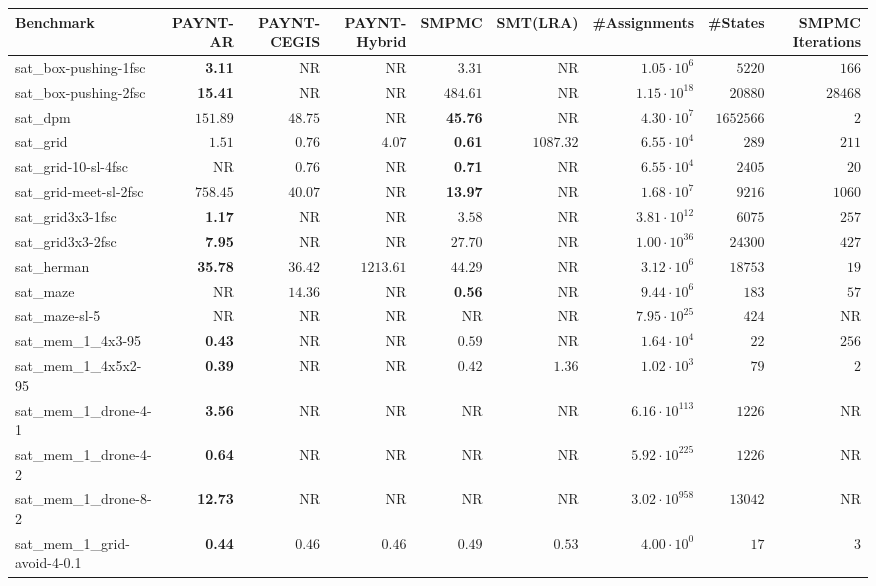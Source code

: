 \begin{tabular}{lrrrrrrrr}
\toprule
Benchmark & PAYNT-AR & PAYNT-CEGIS & PAYNT-Hybrid & SMPMC & SMT(LRA) & \#Assignments & \#States & SMPMC Iterations \\
\midrule
sat\_box-pushing-1fsc & \textbf{3.11} & NR & NR & $3.31$ & NR & $1.05\cdot 10^{6}$ & $5220$ & $166$ \\
sat\_box-pushing-2fsc & \textbf{15.41} & NR & NR & $484.61$ & NR & $1.15\cdot 10^{18}$ & $20880$ & $28468$ \\
sat\_dpm & $151.89$ & $48.75$ & NR & \textbf{45.76} & NR & $4.30\cdot 10^{7}$ & $1652566$ & $2$ \\
sat\_grid & $1.51$ & $0.76$ & $4.07$ & \textbf{0.61} & $1087.32$ & $6.55\cdot 10^{4}$ & $289$ & $211$ \\
sat\_grid-10-sl-4fsc & NR & $0.76$ & NR & \textbf{0.71} & NR & $6.55\cdot 10^{4}$ & $2405$ & $20$ \\
sat\_grid-meet-sl-2fsc & $758.45$ & $40.07$ & NR & \textbf{13.97} & NR & $1.68\cdot 10^{7}$ & $9216$ & $1060$ \\
sat\_grid3x3-1fsc & \textbf{1.17} & NR & NR & $3.58$ & NR & $3.81\cdot 10^{12}$ & $6075$ & $257$ \\
sat\_grid3x3-2fsc & \textbf{7.95} & NR & NR & $27.70$ & NR & $1.00\cdot 10^{36}$ & $24300$ & $427$ \\
sat\_herman & \textbf{35.78} & $36.42$ & $1213.61$ & $44.29$ & NR & $3.12\cdot 10^{6}$ & $18753$ & $19$ \\
sat\_maze & NR & $14.36$ & NR & \textbf{0.56} & NR & $9.44\cdot 10^{6}$ & $183$ & $57$ \\
sat\_maze-sl-5 & NR & NR & NR & NR & NR & $7.95\cdot 10^{25}$ & $424$ & NR \\
sat\_mem\_1\_4x3-95 & \textbf{0.43} & NR & NR & $0.59$ & NR & $1.64\cdot 10^{4}$ & $22$ & $256$ \\
sat\_mem\_1\_4x5x2-95 & \textbf{0.39} & NR & NR & $0.42$ & $1.36$ & $1.02\cdot 10^{3}$ & $79$ & $2$ \\
sat\_mem\_1\_drone-4-1 & \textbf{3.56} & NR & NR & NR & NR & $6.16\cdot 10^{113}$ & $1226$ & NR \\
sat\_mem\_1\_drone-4-2 & \textbf{0.64} & NR & NR & NR & NR & $5.92\cdot 10^{225}$ & $1226$ & NR \\
sat\_mem\_1\_drone-8-2 & \textbf{12.73} & NR & NR & NR & NR & $3.02\cdot 10^{958}$ & $13042$ & NR \\
sat\_mem\_1\_grid-avoid-4-0.1 & \textbf{0.44} & $0.46$ & $0.46$ & $0.49$ & $0.53$ & $4.00\cdot 10^{0}$ & $17$ & $3$ \\

\end{tabular}
